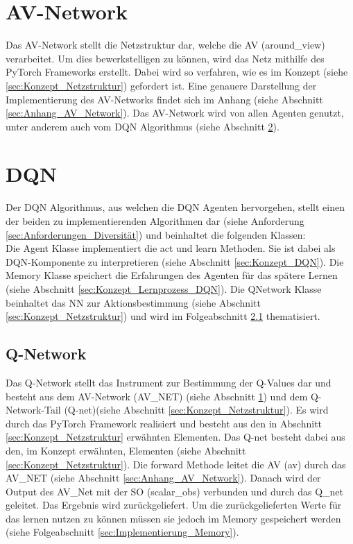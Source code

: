 \section{AV-Network} \label{sec:Implementierung_AV_Network}
Das AV-Network stellt die Netzstruktur dar, welche die AV (around\_view) verarbeitet. Um dies bewerkstelligen zu können, wird das Netz mithilfe des PyTorch Frameworks erstellt. Dabei wird so verfahren, wie es im Konzept (siehe \ref{sec:Konzept_Netzstruktur}) gefordert ist. Eine genauere Darstellung der Implementierung des AV-Networks findet sich im Anhang (siehe Abschnitt \ref{sec:Anhang_AV_Network}). Das AV-Network wird von allen Agenten genutzt, unter anderem auch vom DQN Algorithmus (siehe Abschnitt \ref{sec:Implementierung_DQN}).

\section{DQN} \label{sec:Implementierung_DQN}
Der DQN Algorithmus, aus welchen die DQN Agenten hervorgehen, stellt einen der beiden zu implementierenden Algorithmen dar (siehe Anforderung \ref{sec:Anforderungen_Diversität}) und beinhaltet die folgenden Klassen:\\
Die Agent Klasse implementiert die act und learn Methoden. Sie ist dabei als DQN-Komponente zu interpretieren (siehe Abschnitt \ref{sec:Konzept_DQN}).
Die Memory Klasse speichert die Erfahrungen des Agenten für das spätere Lernen (siehe Abschnitt \ref{sec:Konzept_Lernprozess_DQN}). Die QNetwork Klasse beinhaltet das NN zur Aktionsbestimmung (siehe Abschnitt \ref{sec:Konzept_Netzstruktur}) und wird im Folgeabschnitt \ref{sec:Implementierung_Q-Network} thematisiert.

\subsection{Q-Network} \label{sec:Implementierung_Q-Network}
Das Q-Network stellt das Instrument zur Bestimmung der Q-Values dar und besteht aus dem AV-Network (AV\_NET) (siehe Abschnitt \ref{sec:Implementierung_AV_Network}) und dem Q-Network-Tail (Q-net)(siehe Abschnitt \ref{sec:Konzept_Netzstruktur}).
Es wird durch das PyTorch Framework realisiert und besteht aus den in Abschnitt \ref{sec:Konzept_Netzstruktur} erwähnten Elementen.
Das Q-net besteht dabei aus den, im Konzept erwähnten, Elementen (siehe Abschnitt \ref{sec:Konzept_Netzstruktur}).
Die forward Methode leitet die AV (av) durch das AV\_NET (siehe Abschnitt \ref{sec:Anhang_AV_Network}). Danach wird der Output des AV\_Net mit der SO (scalar\_obs) verbunden und durch das Q\_net geleitet. Das Ergebnis wird zurückgeliefert. Um die zurückgelieferten Werte für das lernen nutzen zu können müssen sie jedoch im Memory gespeichert werden (siehe Folgeabschnitt \ref{sec:Implementierung_Memory}).

